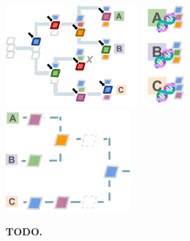 \begin{figure}
\includegraphics[height=1.5in]{img/hstratschematic-evolve}
\includegraphics[height=1.5in]{img/hstratschematic-sample}
\includegraphics[height=1.5in]{img/hstratschematic-reconstruct}

\caption{\textbf{TODO.}}
\label{fig:hstratschematic}

\end{figure}